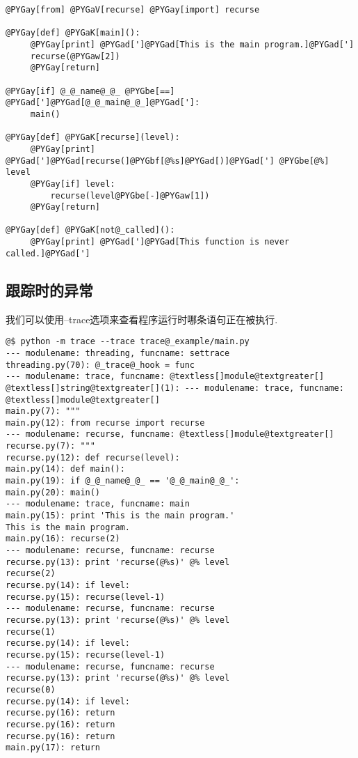 \documentclass[a4paper,10pt,english]{manual}
\begin{document}
\begin{Verbatim}[commandchars=@\[\]]
@PYGay[from] @PYGaV[recurse] @PYGay[import] recurse

@PYGay[def] @PYGaK[main]():
     @PYGay[print] @PYGad[']@PYGad[This is the main program.]@PYGad[']
     recurse(@PYGaw[2])
     @PYGay[return]

@PYGay[if] @_@_name@_@_ @PYGbe[==] @PYGad[']@PYGad[@_@_main@_@_]@PYGad[']:
     main()

@PYGay[def] @PYGaK[recurse](level):
     @PYGay[print] @PYGad[']@PYGad[recurse(]@PYGbf[@%s]@PYGad[)]@PYGad['] @PYGbe[@%] level
     @PYGay[if] level:
         recurse(level@PYGbe[-]@PYGaw[1])
     @PYGay[return]

@PYGay[def] @PYGaK[not@_called]():
     @PYGay[print] @PYGad[']@PYGad[This function is never called.]@PYGad[']
\end{Verbatim}


\subsection{跟踪时的异常}

我们可以使用--trace选项来查看程序运行时哪条语句正在被执行.

\begin{Verbatim}[commandchars=@\[\]]
@$ python -m trace --trace trace@_example/main.py
--- modulename: threading, funcname: settrace
threading.py(70): @_trace@_hook = func
--- modulename: trace, funcname: @textless[]module@textgreater[]
@textless[]string@textgreater[](1): --- modulename: trace, funcname: @textless[]module@textgreater[]
main.py(7): """
main.py(12): from recurse import recurse
--- modulename: recurse, funcname: @textless[]module@textgreater[]
recurse.py(7): """
recurse.py(12): def recurse(level):
main.py(14): def main():
main.py(19): if @_@_name@_@_ == '@_@_main@_@_':
main.py(20): main()
--- modulename: trace, funcname: main
main.py(15): print 'This is the main program.'
This is the main program.
main.py(16): recurse(2)
--- modulename: recurse, funcname: recurse
recurse.py(13): print 'recurse(@%s)' @% level
recurse(2)
recurse.py(14): if level:
recurse.py(15): recurse(level-1)
--- modulename: recurse, funcname: recurse
recurse.py(13): print 'recurse(@%s)' @% level
recurse(1)
recurse.py(14): if level:
recurse.py(15): recurse(level-1)
--- modulename: recurse, funcname: recurse
recurse.py(13): print 'recurse(@%s)' @% level
recurse(0)
recurse.py(14): if level:
recurse.py(16): return
recurse.py(16): return
recurse.py(16): return
main.py(17): return
\end{Verbatim}
\end{document}
